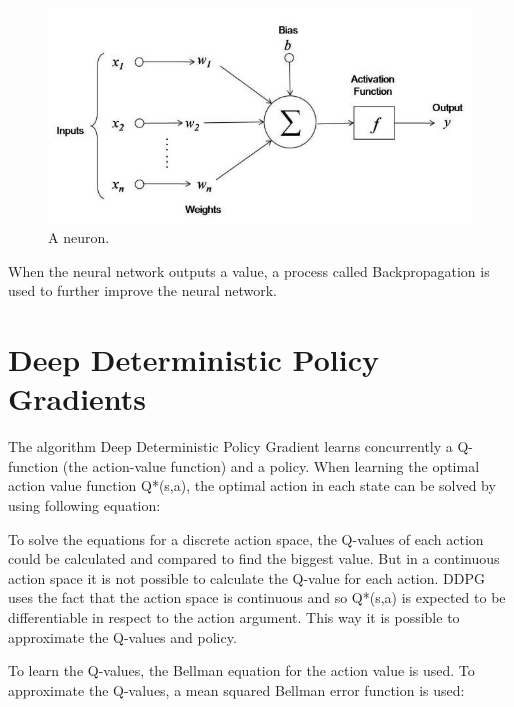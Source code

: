 \begin{figure} [h]
	
	\centering
	\includegraphics[width=1\textwidth]{figures/neuron.jpeg}
	\caption{A neuron. %
	}
\end{figure}

When the neural network outputs a value, a process called Backpropagation is used to further improve the neural network.
 

\vspace{0.5cm}



\section{Deep Deterministic Policy Gradients}

The algorithm Deep Deterministic Policy Gradient learns concurrently a Q-function (the action-value function) and a policy.
When learning the optimal action value function Q*(s,a), the optimal action in each state can be solved by using following equation:


To solve the equations for a discrete action space, the Q-values of each action could be calculated and compared to find the biggest value. But in a continuous action space it is not possible to calculate the Q-value for each action. DDPG uses the fact that the action space is continuous and so Q*(s,a) is expected to be differentiable in respect to the action argument. %
This way it is possible to approximate the Q-values and policy.


To learn the Q-values, the Bellman equation for the action value is used. To approximate the Q-values, a mean squared Bellman error function is used:

